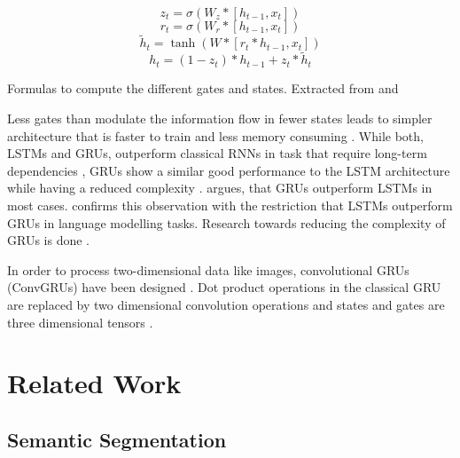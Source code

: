 \documentclass[11pt,
  paper=a4, 
  bibliography=totocnumbered,
	captions=tableheading,
	BCOR=10mm
]{scrreprt}
\theoremstyle{definition}
\begin{document}
\begin{equ}[!ht]
	\begin{equation}
		z_t = \sigma{(W_z * [h_{t-1},x_t])} %
	\end{equation}
	\begin{equation}
		r_t = \sigma{(W_r * [h_{t-1},x_t])}
	\end{equation}
	\begin{equation}
		\widetilde{h}_t = \tanh{(W * [r_t*h_{t-1},x_t])} 
	\end{equation}
	\begin{equation}
		h_t = (1-z_t)*h_{t-1}+z_t*\widetilde{h}_t
	\end{equation} 
\caption{Formulas to compute the different gates and states. Extracted from \textcite{Olah2015} and \textcite{Chung2014}} %
\end{equ}

Less gates than modulate the information flow in fewer states \cite{Chung2014} leads to simpler architecture that is faster to train \cite{Yurdakul2017}
and less memory consuming \cite{Valipour2017}.
While both, LSTMs and GRUs, outperform classical RNNs in task that require long-term dependencies \cite{Chung2014}, GRUs show a similar good performance to the LSTM architecture while having a reduced complexity \cite{Valipour2017}.
\textcite{Dey2017} argues, that GRUs outperform LSTMs in most cases. 
\textcite{Jozefowicz2015} confirms this observation with the restriction that LSTMs outperform GRUs in language modelling tasks.
Research towards reducing the complexity of GRUs is done \cite{Dey2017}.

In order to process two-dimensional data like images, convolutional GRUs (ConvGRUs) have been designed \cite{Ballas2016,Siam2018}.
Dot product operations in the classical GRU are replaced by two dimensional convolution operations \cite{Siam2018} and states and gates are three dimensional tensors \cite{Tokmakov2017}.




\section{Related Work} \label{sec:related_work}


\subsection{Semantic Segmentation}
\end{document}
